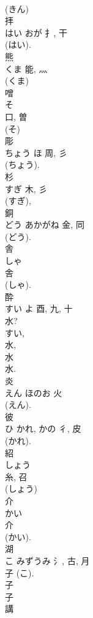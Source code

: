 \documentclass[8pt]{extreport}
\begin{document}
\begin{CJK}{UTF8}{min}
\\	(きん) 
\\	拝	
\\	はい	おが	扌, 干	
\\	(はい). 
\\	熊	
\\	くま	能, 灬	
\\	(くま) 
\\	噌	
\\	そ	
\\	口, 曽	
\\	(そ) 
\\	彫	
\\	ちょう	ほ	周, 彡	
\\	(ちょう). 
\\	杉	
\\	すぎ	木, 彡	
\\	(すぎ), 
\\	銅	
\\	どう	あかがね	金, 同	
\\	(どう). 
\\	舎	
\\	しゃ	
\\	舎	
\\	(しゃ). 
\\	酔	
\\	すい	よ	酉, 九, 十	
\\	水? 
\\	すい, 
\\	水, 
\\	水 
\\	水. 
\\	炎	
\\	えん	ほのお	火	
\\	(えん).	
\\	彼	
\\	ひ	かれ, かの	彳, 皮	
\\	(かれ). 
\\	紹	
\\	しょう	
\\	糸, 召	
\\	(しょう) 
\\	介	
\\	かい	
\\	介	
\\	(かい).	
\\	湖	
\\	こ	みずうみ	氵, 古, 月	
\\	子 (こ).
\\	子 
\\	子 
\\	講	

\end{CJK}
\end{document}

